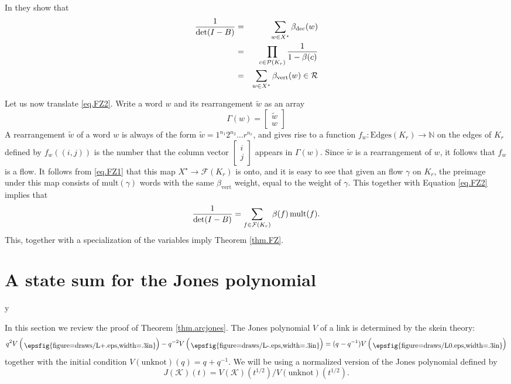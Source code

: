 \documentclass{amsart}
\theoremstyle{plain}
\theoremstyle{definition}
\theoremstyle{remark}
\def\printname#1{
        \if\draft y
                \smash{\makebox[0pt]{\hspace{-0.5in}
                        \raisebox{8pt}{\tt\tiny #1}}}
        \fi
}
\newcommand{\psdraw}[2]
         {\begin{array}{c} \hspace{-1.3mm}
        \raisebox{-4pt}{\epsfig{figure=draws/#1.eps,width=#2}}
        \hspace{-1.9mm}\end{array}}
\def\lbl#1{\label{#1}\printname{#1}}
\def\BN{\mathbb N}
\def\K{\mathcal K}
\def\F{\mathcal F}
\def\P{\mathcal P}
\def\R{\mathcal R}
\def\Ga{\Gamma}
\def\ga{\gamma}
\def\Ga{\Gamma}
\def\b{\beta}
\def\ti{\widetilde}
\def\longto{\longrightarrow}
\def\mult{\mathrm{mult}}
\def\dec{\mathrm{dec}}
\def\vert{\mathrm{vert}}
\def\longto{\longrightarrow}
\def\unknot{\mathrm{unknot}}
\begin{document}
In \cite[Theorem 1.1]{FZ} they show that
\begin{eqnarray}
\lbl{eq.FZ1}
\frac{1}{\det(I-B)} &=& \sum_{w \in X^\star} \b_{\dec}(w)\\ 
&=& \prod_{c \in \P(K_r)} \frac{1}{1-\b(c)}\\
\lbl{eq.FZ2}
&=& \sum_{w \in X^\star} \b_{\vert}(w) \in \R
\end{eqnarray}


Let us now translate \eqref{eq.FZ2}. Write a word $w$ and its rearrangement
$\ti w$ as an array
$$
\Ga(w)= \left[
\begin{matrix}
 \ti w \\
 w   
\end{matrix}
\right]
$$
A rearrangement $\ti w$ of a word $w$
is always of the form $\ti w=1^{n_1} 2^{n_2} \dots r^{n_r}$, and gives
rise to a function $f_w:\mathrm{Edges}(K_r)\longto \BN$ on the edges of $K_r$ 
defined by 
$f_w((i,j))$ is the number that the column vector $\left[
\begin{matrix}
 i \\
 j  
\end{matrix}
\right]
$ appears in $\Ga(w)$.
Since $\ti w$ is a rearrangement of $w$, it follows that $f_w$ is a flow. 
It follows from \ref{eq.FZ1} that this map $X^\star \longto \F(K_r)$
is onto, and it is easy to see that given an flow $\ga$ on $K_r$, the preimage
under this map consists of $\mult(\ga)$ words with the same $\b_{\vert}$
weight, equal to the weight of $\ga$. This together with
Equation \eqref{eq.FZ2} implies that
\begin{equation}
\lbl{eq.FZnew2}
\frac{1}{\det(I-B)}=
\sum_{f \in \F(K_r)} \b(f)\, \mult(f).
\end{equation}
This, together with a specialization of the variables imply Theorem 
\ref{thm.FZ}.




\section{A state sum for the Jones polynomial}
\lbl{sec.LW}

In this section we review the proof of Theorem \ref{thm.arcjones}.
The Jones polynomial $V$ of a link is determined by the skein theory:
$$
q^2 V\left(\psdraw{L+}{.3in}\right)-q^{-2} V\left(\psdraw{L-}{.3in}\right)
=(q^{}-q^{-1}) V\left(\psdraw{L0}{.3in}\right)
$$
together with the initial condition $V(\unknot)(q)=q^{}+q^{-1}$. We will
be using a normalized version of the Jones polynomial defined by
$$ 
J(\K)(t)=V(\K)(t^{1/2})/V(\unknot)(t^{1/2}). 
$$
\end{document}
